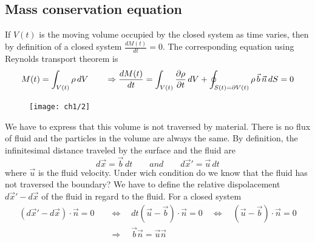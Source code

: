 	\subsection{Mass conservation equation}
	If $V(t)$ is the moving volume occupied by the closed system as time varies, then by definition of a closed system $\frac{dM(t)}{dt} = 0$. The corresponding equation using Reynolds transport theorem is 
	\begin{equation}
		M(t) = \int _{V(t)} \rho\, dV \qquad \Rightarrow \frac{dM(t)}{dt} = \int _{V(t)} \frac{\partial \rho}{\partial t}\, dV + \oint _{S(t) = \partial V(t)} \rho\, \vec{b}\, \vec{n}\, dS = 0
	\end{equation}
	\begin{figure}
	\vspace{-5mm}
	\texttt{[image: ch1/2]}
	\label{fig:1.2}
	\end{figure}
	We have to express that this volume is not traversed by material. There is no flux of fluid and the particles in the volume are always the same. By definition, the infinitesimal distance traveled by the surface and the fluid are
	\begin{equation}
		d\vec{x} = \vec{b}\, dt \qquad and \qquad d\vec{x}' = \vec{u}\, dt
	\end{equation}	 
	where $\vec{u}$ is the fluid velocity. Under wich condition do we know that the fluid has not traversed the boundary? We have to define the relative dispolacement $d\vec{x}'-d\vec{x}$ of the fluid in regard to the fluid. For a closed system 
	\begin{equation}
	\begin{aligned}
		(d\vec{x}'-d\vec{x})\cdot \vec{n} = 0 \quad &\Leftrightarrow \quad dt (\vec{u}-\vec{b})\cdot \vec{n} = 0 \quad \Leftrightarrow \quad (\vec{u}-\vec{b})\cdot \vec{n} = 0 \\
		&\Rightarrow \quad \vec{b} \vec{n} = \vec{u} \vec{n}
		\end{aligned}
	\end{equation}
	\begin{center}
	\end{center}
	
